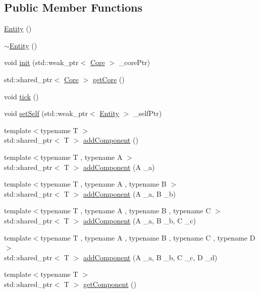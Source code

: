 \subsection*{Public Member Functions}
\begin{DoxyCompactItemize}
\item 
\hyperlink{classmyengine_1_1_entity_a5d604268b8ba4244f61bb94f94cd733e}{Entity} ()
\item 
\hyperlink{classmyengine_1_1_entity_a1f09697ca205ce1322e33b8e30c6fd98}{$\sim$\+Entity} ()
\item 
void \hyperlink{classmyengine_1_1_entity_a8b69d2ad88cb674d36b14251d8795d9c}{init} (std\+::weak\+\_\+ptr$<$ \hyperlink{classmyengine_1_1_core}{Core} $>$ \+\_\+core\+Ptr)
\item 
std\+::shared\+\_\+ptr$<$ \hyperlink{classmyengine_1_1_core}{Core} $>$ \hyperlink{classmyengine_1_1_entity_a1d39705dcf1bb5022b03d52f7622da31}{get\+Core} ()
\item 
void \hyperlink{classmyengine_1_1_entity_ab0a125079867c099760260086386f4c2}{tick} ()
\item 
void \hyperlink{classmyengine_1_1_entity_a04394bae3f2ce6b6ee0cd2e2a0d62898}{set\+Self} (std\+::weak\+\_\+ptr$<$ \hyperlink{classmyengine_1_1_entity}{Entity} $>$ \+\_\+self\+Ptr)
\item 
{\footnotesize template$<$typename T $>$ }\\std\+::shared\+\_\+ptr$<$ T $>$ \hyperlink{classmyengine_1_1_entity_a2c69500893f016340c50603e9fa1910c}{add\+Component} ()
\item 
{\footnotesize template$<$typename T , typename A $>$ }\\std\+::shared\+\_\+ptr$<$ T $>$ \hyperlink{classmyengine_1_1_entity_acb1f6835d2682b472c15ea3f9549cf06}{add\+Component} (A \+\_\+a)
\item 
{\footnotesize template$<$typename T , typename A , typename B $>$ }\\std\+::shared\+\_\+ptr$<$ T $>$ \hyperlink{classmyengine_1_1_entity_a699b9337feb98eb1710124e2342f6b08}{add\+Component} (A \+\_\+a, B \+\_\+b)
\item 
{\footnotesize template$<$typename T , typename A , typename B , typename C $>$ }\\std\+::shared\+\_\+ptr$<$ T $>$ \hyperlink{classmyengine_1_1_entity_a0565fdbc952c09573366f081f0a7cb39}{add\+Component} (A \+\_\+a, B \+\_\+b, C \+\_\+c)
\item 
{\footnotesize template$<$typename T , typename A , typename B , typename C , typename D $>$ }\\std\+::shared\+\_\+ptr$<$ T $>$ \hyperlink{classmyengine_1_1_entity_ad2a7f70c6260d632660be1b87940d34f}{add\+Component} (A \+\_\+a, B \+\_\+b, C \+\_\+c, D \+\_\+d)
\item 
{\footnotesize template$<$typename T $>$ }\\std\+::shared\+\_\+ptr$<$ T $>$ \hyperlink{classmyengine_1_1_entity_a4c9766055bdda5a8c398417c66e085b9}{get\+Component} ()
\end{DoxyCompactItemize}


